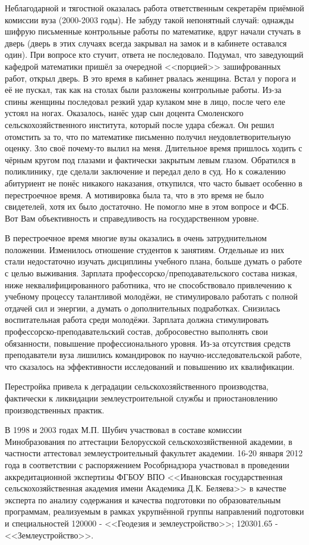 Неблагодарной и тягостной оказалась работа ответственным секретарём приёмной комиссии вуза (2000-2003 годы). Не забуду такой непонятный случай: однажды шифрую письменные контрольные работы по математике, вдруг начали стучать в дверь (дверь в этих случаях всегда закрывал на замок и в кабинете оставался один). При вопросе кто стучит, ответа не последовало. Подумал, что заведующий кафедрой математики пришёл за очередной <<порцией>> зашифрованных работ, открыл дверь. В это время в кабинет рвалась женщина. Встал у порога и её не пускал, так как на столах были разложены контрольные работы. Из-за спины женщины последовал резкий удар кулаком мне в лицо, после чего еле устоял на ногах. Оказалось, нанёс удар сын доцента Смоленского сельскохозяйственного института, который после удара сбежал. Он решил отомстить за то, что по математике письменно получил неудовлетворительную оценку. Зло своё почему-то вылил на меня. Длительное время пришлось ходить с чёрным кругом под глазами и фактически закрытым левым глазом. Обратился в поликлинику, где сделали заключение и передал дело в суд. Но к сожалению абитуриент не понёс никакого наказания, откупился, что часто бывает особенно в перестроечное время. А мотивировка была та, что в это время не было свидетелей, хотя их было достаточно. Не помогло мне в этом вопросе и ФСБ. Вот Вам объективность и справедливость на государственном уровне.

В перестроечное время многие вузы оказались в очень затруднительном положении. Изменилось отношение студентов к занятиям. Отдельные из них стали недостаточно изучать дисциплины учебного плана, больше думать о работе с целью выживания. Зарплата профессорско\-/преподавательского состава низкая, ниже неквалифицированного работника, что не способствовало привлечению к учебному процессу талантливой молодёжи, не стимулировало работать с полной отдачей сил и энергии, а думать о дополнительных подработках. Снизилась воспитательная работа среди молодёжи. Зарплата должна стимулировать профессорско-преподавательский состав, добросовестно выполнять свои обязанности, повышение профессионального уровня. Из-за отсутствия средств преподаватели вуза лишились командировок по научно-исследовательской работе, что сказалось на эффективности исследований и повышению их квалификации. 

Перестройка привела к деградации сельскохозяйственного производства, фактически к ликвидации землеустроительной службы и приостановлению производственных практик. 

В 1998 и 2003 годах М.П. Шубич участвовал в составе комиссии Минобразования по аттестации Белорусской сельскохозяйственной академии, в частности аттестовал землеустроительный факультет академии. 16-20 января 2012 года в соответствии с распоряжением Рособрнадзора участвовал в проведении аккредитационной экспертизы ФГБОУ ВПО <<Ивановская государственная сельскохозяйственная академия имени Академика Д.К. Беляева>> в качестве эксперта по анализу содержания и качества подготовки по образовательным программам, реализуемым в рамках укрупнённой группы направлений подготовки и специальностей 120000 - <<Геодезия и землеустройство>>; 120301.65 - <<Землеустройство>>.

